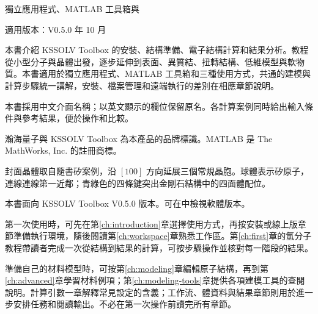 \thispagestyle{plain}

\vspace{5mm}
\noindent 獨立應用程式、MATLAB\regmark{} 工具箱與\ksonline{}\par
\noindent 適用版本：V0.5.0 年 10 月

\vspace{7mm}
本書介紹 KSSOLV Toolbox 的安裝、結構準備、電子結構計算和結果分析。教程從小型分子與晶體出發，逐步延伸到表面、異質結、扭轉結構、低維模型與軟物質。本書適用於獨立應用程式、MATLAB\regmark{} 工具箱和\ksonline{}三種使用方式，共通的建模與計算步驟統一講解，安裝、檔案管理和遠端執行的差別在相應章節說明。

本書採用中文介面名稱；以英文顯示的欄位保留原名。各計算案例同時給出輸入條件與參考結果，便於操作和比較。

\vspace{\baselineskip}

瀚海量子\regmark{}與 KSSOLV Toolbox 為本產品的品牌標識。MATLAB\regmark{} 是 The MathWorks, Inc. 的註冊商標。

\vspace{\baselineskip}

封面晶體取自隨書矽案例，沿 $[100]$ 方向延展三個常規晶胞。球體表示矽原子，連線連線第一近鄰；青綠色的四條鍵突出金剛石結構中的四面體配位。

\vfill
{}
\clearpage


\vspace{4mm}

本書面向 KSSOLV Toolbox V0.5.0 版本。可在中檢視軟體版本。

\vspace{\baselineskip}

第一次使用時，可先在第\ref{ch:introduction}章選擇使用方式，再按安裝或線上版章節準備執行環境，隨後閱讀第\ref{ch:workspace}章熟悉工作區。第\ref{ch:first}章的氫分子教程帶讀者完成一次從結構到結果的計算，可按步驟操作並核對每一階段的結果。

準備自己的材料模型時，可按第\ref{ch:modeling}章編輯原子結構，再到第\ref{ch:advanced}章學習材料例項；第\ref{ch:modeling-tools}章提供各項建模工具的查閱說明。計算引數一章解釋常見設定的含義；工作流、體資料與結果章節則用於進一步安排任務和閱讀輸出。不必在第一次操作前讀完所有章節。

